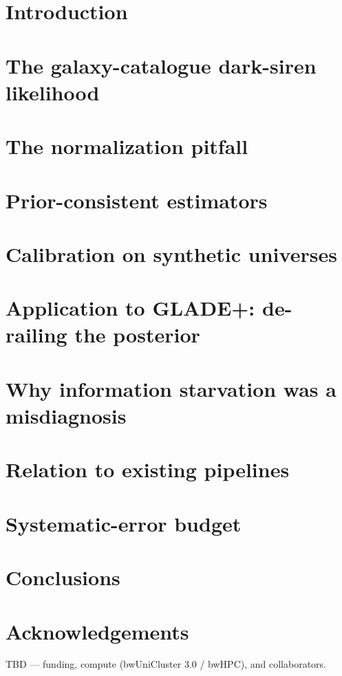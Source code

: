 \documentclass[usenatbib]{mnras}
\begin{document}
\section{Introduction}
\label{sec:intro}
\section{The galaxy-catalogue dark-siren likelihood}
\label{sec:framework}
\section{The normalization pitfall}
\label{sec:pitfall}
\section{Prior-consistent estimators}
\label{sec:estimators}
\section{Calibration on synthetic universes}
\label{sec:coverage}
\section{Application to GLADE+: de-railing the posterior}
\label{sec:realdata}
\section{Why information starvation was a misdiagnosis}
\label{sec:postmortem}
\section{Relation to existing pipelines}
\label{sec:codes}
\section{Systematic-error budget}
\label{sec:budget}
\section{Conclusions}
\label{sec:conclusions}


\section*{Acknowledgements}
TBD --- funding, compute (bwUniCluster 3.0 / bwHPC), and collaborators.
\end{document}
